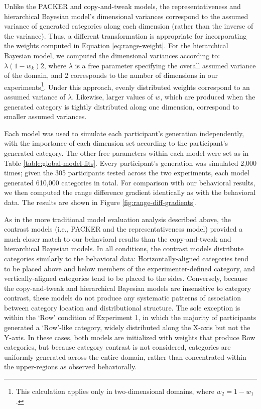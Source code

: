 \documentclass[12pt]{article}
\begin{document}
\begin{flushleft}
Unlike the PACKER and copy-and-tweak models, the representativeness and
hierarchical Bayesian model's dimensional variances correspond to the assumed
variance of generated categories along each dimension (rather than the inverse
of the variance). Thus, a different transformation is appropriate for
incorporating the weights computed in Equation \ref{eq:range-weight}. For the
hierarchical Bayesian model, we computed the dimensional variances according to:
$\lambda (1-w_k) 2$, where $\lambda$ is a free parameter specifying the overall
assumed variance of the domain, and $2$ corresponds to the number of dimensions
in our experiments\footnote{This calculation applies only in two-dimensional
  domains, where $w_2 = 1-w_1$.}. Under this approach, evenly distributed
weights correspond to an assumed variance of $\lambda$. Likewise, larger values
of $w$, which are produced when the generated category is tightly distributed
along one dimension, correspond to smaller assumed variances.

Each model was used to simulate each participant's generation independently,
with the importance of each dimension set according to the participant's
generated category. The other free parameters within each model were set as in
Table \ref{table:global-model-fits}. Every participant's generation was
simulated 2,000 times; given the 305 participants tested across the two
experiments, each model generated 610,000 categories in total. For comparison
with our behavioral results, we then computed the range difference gradient
identically as with the behavioral data. The results are shown in Figure
\ref{fig:range-diff-gradients}.

As in the more traditional model evaluation analysis described above, the
contrast models (i.e., PACKER and the representativeness model) provided a much
closer match to our behavioral results than the copy-and-tweak and hierarchical
Bayesian models. In all conditions, the contrast models distribute categories
similarly to the behavioral data: Horizontally-aligned categories tend to be
placed above and below members of the experimenter-defined category, and
vertically-aligned categories tend to be placed to the sides. Conversely,
because the copy-and-tweak and hierarchical Bayesian models are insensitive to
category contrast, these models do not produce any systematic patterns of
association between category location and distributional structure. The sole
exception is within the `Row' condition of Experiment 1, in which the majority
of participants generated a `Row'-like category, widely distributed along the
X-axis but not the Y-axis. In these cases, both models are initialized with
weights that produce Row categories, but because category contrast is not
considered, categories are uniformly generated across the entire domain, rather
than concentrated within the upper-regions as observed behaviorally.


\end{flushleft}
\end{document}
